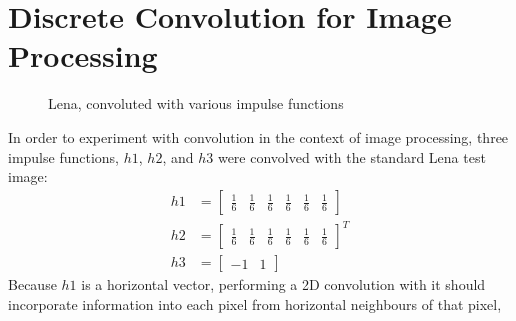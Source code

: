 \documentclass{sydeStyle}
\begin{document}



\section*{Discrete Convolution for Image Processing}
 \begin{figure}
	\begin{center}
	\end{center}
	\caption{Lena, convoluted with various impulse functions}
	\label{SummingAmp2}
\end{figure}
In order to experiment with convolution in the context of image processing,
three impulse functions, $h1$, $h2$, and $h3$ were convolved with the standard
Lena test image:
\begin{align*}
	h1 & = \begin{bmatrix}\frac{1}{6} & \frac{1}{6} & \frac{1}{6} & \frac{1}{6}
		& \frac{1}{6} & \frac{1}{6}\end{bmatrix} \\
	h2 & = \begin{bmatrix}\frac{1}{6} & \frac{1}{6} & \frac{1}{6} & \frac{1}{6}
		& \frac{1}{6} & \frac{1}{6}\end{bmatrix}^T \\
	h3 & = \begin{bmatrix}-1 & 1\end{bmatrix}
\end{align*}
Because $h1$ is a horizontal vector, performing a 2D convolution with it should
incorporate information into each pixel from horizontal neighbours of that pixel,
\end{document}
